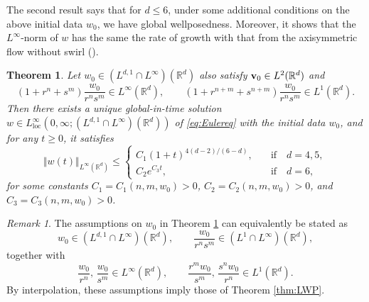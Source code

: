 \documentclass[11pt]{amsart}
\newcommand{\Blue}[1]{\begingroup\color{blue} #1\endgroup}
\newtheorem{thm}{Theorem}[section]
\theoremstyle{definition}
\theoremstyle{remark}
\newtheorem{remark}[theorem]{Remark}
\numberwithin{equation}{section}
\numberwithin{equation}{section}
\newcommand{\nrm}[1]{\Vert#1\Vert}
\newcommand{\0}{\emptyset}
\newcommand{\ift}{\infty}
\newcommand{\bfv}{{\bf v}}
\newcommand{\bbR}{\mathbb R}
\begin{document}
	The second result says that for $d\leq 6$, under some additional conditions on the above initial data $w_{0}$, we have global wellposedness. Moreover, it shows that the $L^{\ift}$-norm of $w$ has the same the rate of growth with that from the axisymmetric flow without swirl (\cite{LJ_optimal, SWZ25}).
	\begin{thm}\label{thm:GWP}
		Let $w_{0}\in (L^{d,1}\cap L^{\ift})(\bbR^{d})$ also %
		satisfy $\bfv_{0}\in L^{2}(\bbR^{d})$ %
		and 
		\begin{equation}\label{eq:decaycondi}
			(1+r^{n}+s^{m})\frac{w_{0}}{r^{n}s^{m}}\in L^{\ift}(\bbR^{d}),\qquad (1+r^{n+m}+s^{n+m})\frac{w_{0}}{r^{n}s^{m}}\in L^{1}(\bbR^{d}).
		\end{equation} %
		Then there exists a unique global-in-time solution $w\in L_{\text{loc}}^{\ift}(0,\ift;(L^{d,1}\cap L^{\ift})(\bbR^{d}))$ of \eqref{eq:Eulereq} with the initial data $w_{0}$, and for any $t\geq0$, it satisfies
		\begin{equation} \label{eq:wttime}
			\nrm{w(t)}_{L^{\ift}(\bbR^{d})}\leq \begin{cases}
				C_{1}%
				(1+t)^{4(d-2)/(6-d)},&\quad\text{if}\quad d=4,5,\\
				C_{2}%
				e^{C_{3}%
					t},&\quad\text{if}\quad d=6,
			\end{cases}
		\end{equation}
		for some constants $C_{1}=C_{1}(n,m,w_{0})>0$, $ C_{2}=C_{2}(n,m,w_{0})>0 $, and $C_{3}=C_{3}(n,m,w_{0})>0$.
	\end{thm}
	
	\begin{remark}
		The assumptions on $w_0$ in Theorem \ref{thm:GWP} can equivalently be stated as 
		\[ 
		w_{0}\in (L^{d,1}\cap L^{\ift})(\bbR^{d}), \qquad \frac{w_0}{r^ns^m}\in (L^1\cap L^{\infty}) (\mathbb{R}^d),
		\] 
		together with 
		\[
		\frac{w_0}{r^n}, \, \frac{w_0}{s^m} \in L^{\infty}(\mathbb{R}^d), \qquad \frac{r^m w_0}{s^m}, \, \frac{s^n w_0}{r^n} \in L^1 (\mathbb{R}^d).
		\]
		By interpolation, these assumptions imply those of Theorem \ref{thm:LWP}. 
	\end{remark}
	
\end{document}
